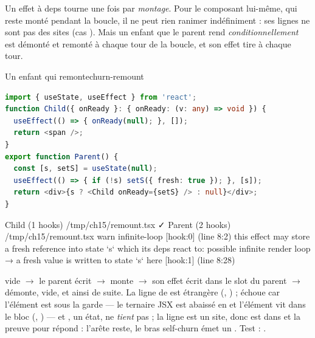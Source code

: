 Un effet à deps \code{[]} tourne une fois par \emph{montage}. Pour le composant lui-même,
qui reste monté pendant la boucle, il ne peut rien ranimer indéfiniment : ses lignes ne sont
pas des sites (cas ). Mais un enfant que le parent rend
\emph{conditionnellement} est démonté et remonté à chaque tour de la boucle, et son effet
\code{[]} tire à chaque tour.

\begin{exemple}{Un enfant qui remonte}{churn-remount}
\begin{lstlisting}[language=TypeScript,caption={\file{/tmp/ch15/remount.tsx}},label={lst:churn-remount}]
import { useState, useEffect } from 'react';
function Child({ onReady }: { onReady: (v: any) => void }) {
  useEffect(() => { onReady(null); }, []);
  return <span />;
}
export function Parent() {
  const [s, setS] = useState(null);
  useEffect(() => { if (!s) setS({ fresh: true }); }, [s]);
  return <div>{s ? <Child onReady={setS} /> : null}</div>;
}
\end{lstlisting}
\begin{sortie}
  Child  (1 hooks)  /tmp/ch15/remount.tsx  ✓
  Parent  (2 hooks)  /tmp/ch15/remount.tsx
    warn   infinite-loop  [hook:0]  (line 8:2)  this effect may store a fresh reference into state `s` which its deps react to: possible infinite render loop
       → a fresh value is written to state `s` here [hook:1] (line 8:28)
\end{sortie}
 vide $\to$ le parent écrit  $\to$  monte $\to$ son
effet écrit  dans le slot du parent $\to$  démonte,  vide,
et ainsi de suite. La ligne de  est étrangère (,
) ;  échoue car l'élément 
est sous la garde  --- le ternaire JSX est abaissé en  et l'élément
vit dans le bloc  (,
) --- et , un état, ne \emph{tient} pas ; la ligne est un site, donc
 est dans  et la preuve pour  répond
 : l'arête  reste, le bras self-churn émet un \Warning. Test :
\allowbreak{}.
\end{exemple}


